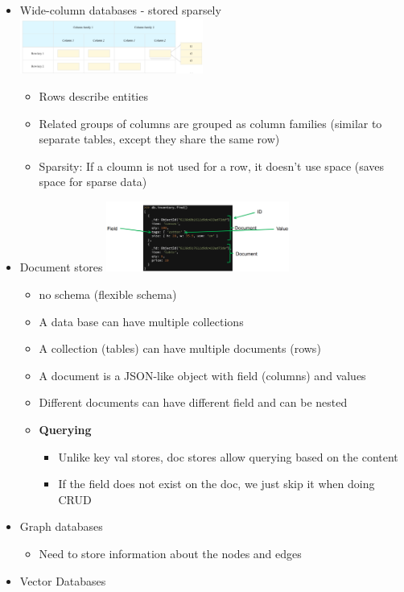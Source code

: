 \documentclass[10pt, landscape]{article}
\begin{document}
\begin{multicols}{4}
\begin{itemize}
  \item Wide-column databases - stored sparsely
  \includegraphics*[width=6cm]{wide_col} 
  \begin{itemize}
    \item Rows describe entities
    \item Related groups of columns are grouped as column families (similar to separate tables, except they share the same row)
    \item Sparsity: If a cloumn is not used for a row, it doesn't use space (saves space for sparse data)
  \end{itemize}
  \item Document stores 
  \includegraphics*[width=6cm]{doc_model}
  \begin{itemize}
    \item no schema (flexible schema)
    \item A data base can have multiple collections 
    \item A collection (tables) can have multiple documents (rows)
    \item A document is a JSON-like object with field (columns) and values 
    \item Different documents can have different field and can be nested   
    \item \textbf{Querying}
    \begin{itemize}
      \item Unlike key val stores, doc stores allow querying based on the content 
      \item If the field does not exist on the doc, we just skip it when doing CRUD
    \end{itemize}
  \end{itemize}
  \item Graph databases
  \begin{itemize}
    \item Need to store information about the nodes and edges
  \end{itemize}
  \item Vector Databases

\end{itemize}
\end{multicols}
\end{document}

